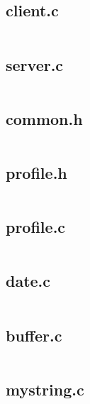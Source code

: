 \subsection{client.c}
\inputminted[linenos,fontsize=\footnotesize]{C}{../src/client.c}
\subsection{server.c}
\inputminted[linenos,fontsize=\footnotesize]{C}{../src/server.c}
\subsection{common.h}
\inputminted[linenos,fontsize=\footnotesize]{C}{../src/common.h}
\subsection{profile.h}
\inputminted[linenos,fontsize=\footnotesize]{C}{../src/profile.h}
\subsection{profile.c}
\inputminted[linenos,fontsize=\footnotesize]{C}{../src/profile.c}
\subsection{date.c}
\inputminted[linenos,fontsize=\footnotesize]{C}{../src/date.c}
\subsection{buffer.c}
\inputminted[linenos,fontsize=\footnotesize]{C}{../src/buffer.c}
\subsection{mystring.c}
\inputminted[linenos,fontsize=\footnotesize]{C}{../src/mystring.c}
